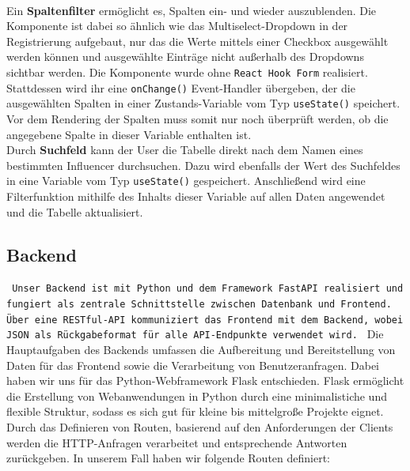 \documentclass[conference,a4paper,flushend]{cs-techrep}
\begin{document}
\begin{enumerate}
\\
Ein \textbf{Spaltenfilter} ermöglicht es, Spalten ein- und wieder auszublenden. Die Komponente ist dabei so ähnlich wie das Multiselect-Dropdown in der Registrierung aufgebaut, nur das die Werte mittels einer Checkbox ausgewählt werden können und ausgewählte Einträge nicht außerhalb des Dropdowns sichtbar werden. Die Komponente wurde ohne \texttt{React Hook Form} realisiert. Stattdessen wird ihr eine \texttt{onChange()} Event-Handler übergeben, der die ausgewählten Spalten in einer Zustands-Variable vom Typ \texttt{useState()} speichert. Vor dem Rendering der Spalten muss somit nur noch überprüft werden, ob die angegebene Spalte in dieser Variable enthalten ist. 
\\
Durch \textbf{Suchfeld} kann der User die Tabelle direkt nach dem Namen eines bestimmten Influencer durchsuchen. Dazu wird ebenfalls der Wert des Suchfeldes in eine Variable vom Typ \texttt{useState()} gespeichert. Anschließend wird eine Filterfunktion mithilfe des Inhalts dieser Variable auf allen Daten angewendet und die Tabelle aktualisiert.
\end{enumerate}

\subsection{Backend}
\texttt{
Unser Backend ist mit Python und dem Framework FastAPI realisiert und fungiert als zentrale Schnittstelle zwischen Datenbank und Frontend. Über eine RESTful-API kommuniziert das Frontend mit dem Backend, wobei JSON als Rückgabeformat für alle API-Endpunkte verwendet wird.
}
Die Hauptaufgaben des Backends umfassen die Aufbereitung und Bereitstellung von Daten für das Frontend sowie die Verarbeitung von Benutzeranfragen. Dabei haben wir uns für das Python-Webframework Flask entschieden. Flask ermöglicht die Erstellung von Webanwendungen in Python durch eine minimalistiche und flexible Struktur, sodass es sich gut für kleine bis mittelgroße Projekte eignet. Durch das Definieren von Routen, basierend auf den Anforderungen der Clients werden die HTTP-Anfragen verarbeitet und entsprechende Antworten zurückgeben. In unserem Fall haben wir folgende Routen definiert:
\end{document}
